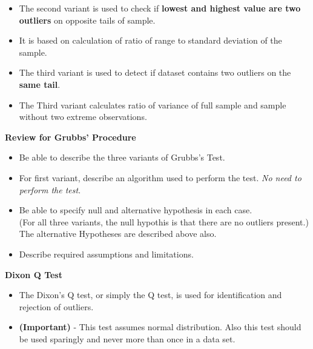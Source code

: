 \documentclass[a4paper,12pt]{article}
\begin{document}
\begin{itemize}
	\item The second variant is used to check if \textbf{lowest and highest value are two outliers} on opposite tails of
	sample. 
	\item It is based on calculation of ratio of range to standard deviation of the sample.
	\bigskip
	\item The third variant is used to detect if dataset contains two outliers on the \textbf{same tail}.
	\item The Third variant calculates ratio of variance of full sample and sample without two extreme observations.
	
\end{itemize}

\Large
\textbf{Review for Grubbs' Procedure}
\begin{itemize}
	\item Be able to describe the three variants of Grubbs's Test.
	\item For first variant, describe an algorithm used to perform the test. \textit{No need to perform the test}.
	\item Be able to specify null and alternative hypothesis in each case.\\ (For all three variants, the null hypothis is that there are no outliers present.) \\ The alternative Hypotheses are described above also.
	\item Describe required assumptions and limitations.
\end{itemize}
\Large
\textbf{Dixon Q Test}\\
\begin{itemize}
	\item The Dixon's Q test, or simply the Q test, is used for identification and rejection of outliers. 
	\item \textbf{(Important)} - This test assumes normal distribution. Also this test should be used sparingly and never more than once in a data set. 
\end{itemize}
\end{document}
